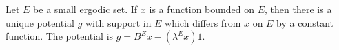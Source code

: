 Let $E$ be a small ergodic set. If $x$ is a function bounded on $E$, then there is a unique potential $g$ with support in $E$ which differs from $x$ on $E$ by a constant function. The potential is $g = B^Ex - (\lambda^Ex)1$.
